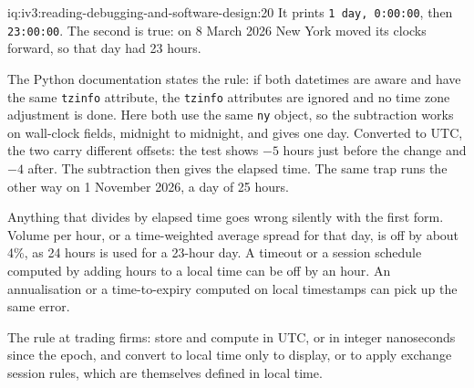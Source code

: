 \begin{solution}{iq:iv3:reading-debugging-and-software-design:20}
It prints \texttt{1 day, 0:00:00}, then \texttt{23:00:00}. The second is true: on 8 March 2026 New York moved its clocks forward, so that day had 23 hours.

The Python documentation states the rule: if both datetimes are aware and have the same \texttt{tzinfo} attribute, the \texttt{tzinfo} attributes are ignored and no time zone adjustment is done. Here both use the same \texttt{ny} object, so the subtraction works on wall-clock fields, midnight to midnight, and gives one day. Converted to UTC, the two carry different offsets: the test shows $-5$ hours just before the change and $-4$ after. The subtraction then gives the elapsed time. The same trap runs the other way on 1 November 2026, a day of 25 hours.

Anything that divides by elapsed time goes wrong silently with the first form. Volume per hour, or a time-weighted average spread for that day, is off by about 4\%, as 24 hours is used for a 23-hour day. A timeout or a session schedule computed by adding hours to a local time can be off by an hour. An annualisation or a time-to-expiry computed on local timestamps can pick up the same error.

The rule at trading firms: store and compute in UTC, or in integer nanoseconds since the epoch, and convert to local time only to display, or to apply exchange session rules, which are themselves defined in local time.


\end{solution}

